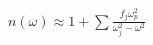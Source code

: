 \documentclass[preview]{standalone}
\begin{document}
\begin{align*}
n(\omega) \approx 1 + \sum \frac{f_j \omega_p^2}{\omega_j^2 - \omega^2}
\end{align*}
\end{document}
